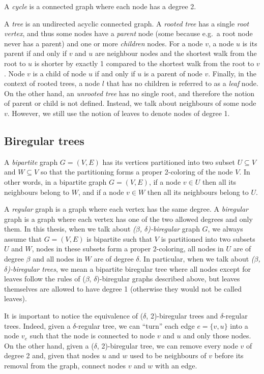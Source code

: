 A \emph{cycle} is a connected graph where each node has a degree 2.

A \emph{tree} is an undirected acyclic connected graph. A \emph{rooted tree}
has a single \emph{root vertex}, and thus some nodes have a \emph{parent} node
(some because e.g.\ a root node never has a parent) and one or more \emph{children}
nodes. For a node $v$, a node $u$ is its parent if and only if $v$ and $u$ are
neighbour nodes and the shortest walk from the root to $u$ is shorter by exactly
1 compared to the shortest walk from the root to $v$. Node $v$ is a child of node
$u$ if and only if $u$ is a parent of node $v$. Finally, in the context of rooted trees,
a node $l$ that has no children is referred to as a \emph{leaf} node.
On the other hand, an \emph{unrooted tree} has no single root, and therefore the notion of parent
or child is not defined. Instead, we talk about neighbours of some node $v$. However, we 
still use the notion of leaves to denote nodes of degree 1.

\subsection{Biregular trees}
\label{subsection:biregular-trees}

A \emph{bipartite} graph $G = (V, E)$ has its vertices partitioned into two
subset $U \subseteq V$ and $W \subseteq V$ so that the partitioning forms
a proper 2-coloring of the node $V$. In other words, in a bipartite graph $G = (V, E)$,
if a node $v \in U$ then all its neighbours belong to $W$, and if a node $v \in W$
then all its neighbours belong to $U$.

A \emph{regular} graph is a graph where each vertex has the same degree.
A \emph{biregular} graph is a graph where each vertex has one of the two
allowed degrees and only them. In this thesis, when we talk about
\emph{($\beta$, $\delta$)-biregular} graph $G$, we always assume that 
$G = (V, E)$ is bipartite such that $V$ is partitioned into two
subsets $U$ and $W$, nodes in these subsets form a proper 2-coloring,
all nodes in $U$ are of degree $\beta$ and all nodes in $W$ are of
degree $\delta$. In particular, when we talk about \emph{($\beta$, $\delta$)-biregular trees},
we mean a bipartite biregular tree where all nodes except for leaves
follow the rules of ($\beta$, $\delta$)-biregular graphs described above,
but leaves themselves are allowed to have degree 1 (otherwise they would not be
called leaves).

It is important to notice the equivalence of ($\delta$, 2)-biregular trees
and $\delta$-regular trees. Indeed, given a $\delta$-regular tree, we can
``turn'' each edge $e = \{v, u\}$ into a node $v_e$ such that the node is
connected to node $v$ and $u$ and only those nodes. On the other hand,
given a ($\delta$, 2)-biregular tree, we can remove every node $v$ of degree
2 and, given that nodes $u$ and $w$ used to be neighbours of $v$ before its
removal from the graph, connect nodes $v$ and $w$ with an edge.

